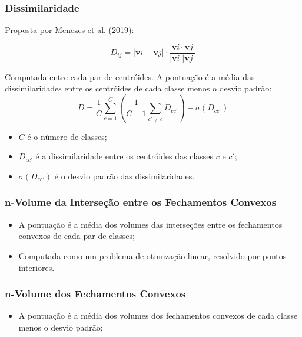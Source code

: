 \begin{frame}

    \frametitle{Dissimilaridade}

    Proposta por Menezes et al. (2019):

    \begin{equation}
        D_{ij} = |\mathbf{v}i - \mathbf{v}j|
        \cdot \frac{\mathbf{v}i \cdot \mathbf{v}j}{|\mathbf{v}i| |\mathbf{v}j|}
    \end{equation}

    Computada entre cada par de centróides. A pontuação é a média das dissimilaridades entre os centróides de cada classe menos o desvio padrão:
    \begin{equation}
        D = \frac{1}{C} \sum_{c=1}^{C} \left( \frac{1}{C-1} \sum_{c' \neq c} D_{cc'} \right) - \sigma(D_{cc'}) 
    \end{equation}

    \begin{itemize}
        \item $C$ é o número de classes;
        \item $D_{cc'}$ é a dissimilaridade entre os centróides das classes $c$ e $c'$;
        \item $\sigma(D_{cc'})$ é o desvio padrão das dissimilaridades.
    \end{itemize}

\end{frame}

\begin{frame}

    \frametitle{n-Volume da Interseção entre os Fechamentos Convexos}

    \begin{itemize}
        \item A pontuação é a média dos volumes das interseções entre os fechamentos convexos de cada par de classes;
        \item Computada como um problema de otimização linear, resolvido por pontos interiores.
    \end{itemize}

\end{frame}

\begin{frame}

    \frametitle{n-Volume dos Fechamentos Convexos}

    \begin{itemize}
        \item A pontuação é a média dos volumes dos fechamentos convexos de cada classe menos o desvio padrão;
    \end{itemize}

\end{frame}


